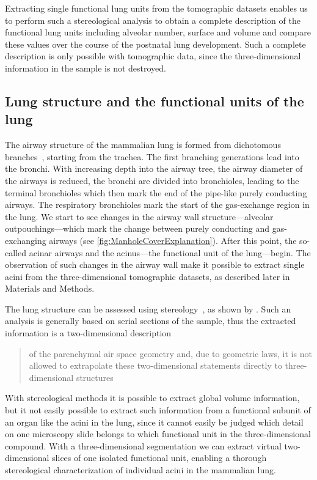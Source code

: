\documentclass[%
	paper=a4,%
	abstract=true,%
	]{scrartcl}
\begin{document}
Extracting single functional lung units from the tomographic datasets enables us to perform such a stereological analysis to obtain a complete description of the functional lung units including alveolar number, surface and volume and compare these values over the course of the postnatal lung development. Such a complete description  is only possible with tomographic data, since the three-dimensional information in the sample is not destroyed.

\subsection{Lung structure and the functional units of the lung}
The airway structure of the mammalian lung is formed from dichotomous branches~\cite{Weibel1991}, starting from the trachea. The first branching generations lead into the bronchi. With increasing depth into the airway tree, the airway diameter of the airways is reduced, the bronchi are divided into bronchioles, leading to the terminal bronchioles which then mark the end of the pipe-like purely conducting airways. The respiratory bronchioles mark the start of the gas-exchange region in the lung. We start to see changes in the airway wall structure---alveolar outpouchings---which mark the change between purely conducting and gas-exchanging airways (see \autoref{fig:ManholeCoverExplanation}). After this point, the so-called acinar airways and the acinus---the functional unit of the lung---begin. The observation of such changes in the airway wall make it possible to extract single acini from the three-dimensional tomographic datasets, as described later in Materials and Methods.

The lung structure can be assessed using stereology~\cite{Hsia2010}, as shown by \citet{Tschanz2002}. Such an analysis is generally based on serial sections of the sample, thus the extracted information is a two-dimensional description \blockquote[\cite{Tschanz2002}]{of the parenchymal air space geometry and, due to geometric laws, it is not allowed to extrapolate these two-dimensional statements directly to three-dimensional structures}. With stereological methods it is possible to extract global volume information, but it not easily possible to extract such information from a functional subunit of an organ like the acini in the lung, since it cannot easily be judged which detail on one microscopy slide belongs to which functional unit in the three-dimensional compound. With a three-dimensional segmentation we can extract virtual two-dimensional slices of one isolated functional unit, enabling a thorough stereological characterization of individual acini in the mammalian lung.
\end{document}
